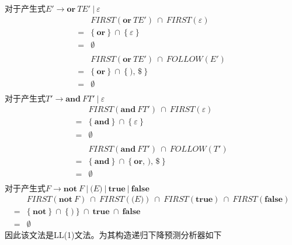 \documentclass{article}
\begin{document}
对于产生式$E' \rightarrow \textbf{or}\ TE'\ |\ \varepsilon$
\begin{align*}
    &FIRST(\textbf{or}\ TE') \ \cap \  FIRST(\varepsilon) \\ =& \big\{\ \textbf{or}\ \big\} \ \cap \  \big\{\ \varepsilon\ \big\} \\
    =& \emptyset \\
    \\
    &FIRST(\textbf{or}\ TE') \ \cap \  FOLLOW(E') \\ =& \big\{\ \textbf{or}\ \big\} \ \cap \  \big\{\ \texttt{)},\,\texttt{\$}\ \big\} \\
    =& \emptyset \\
\end{align*}
对于产生式$T' \rightarrow \textbf{and}\ FT'\ |\ \varepsilon$
\begin{align*}
    &FIRST(\textbf{and}\ FT') \ \cap \  FIRST(\varepsilon) \\ =& \big\{\ \textbf{and}\ \big\} \ \cap \  \big\{\ \varepsilon\ \big\} \\
    =& \emptyset \\
    \\
    &FIRST(\textbf{and}\ FT') \ \cap \  FOLLOW(T') \\ =& \big\{\ \textbf{and}\ \big\} \ \cap \  \big\{\ \textbf{or},\,\texttt{)},\,\texttt{\$}\ \big\} \\
    =& \emptyset \\
\end{align*}
对于产生式$F \rightarrow \textbf{not}\ F\ |\ \texttt{(}E\texttt{)}\ |\ \textbf{true}\ |\ \textbf{false}$
\begin{align*}
    &FIRST(\textbf{not}\ F) \ \cap \  FIRST(\texttt{(}E\texttt{)}) \ \cap \  FIRST(\textbf{true}) \ \cap \  FIRST(\textbf{false}) \\ = &\big\{\ \textbf{not}\ \big\} \ \cap \  \big\{\ \texttt{)}\ \big\} \ \cap \  \textbf{true} \ \cap \  \textbf{false}\\
    =& \emptyset
\end{align*}
因此该文法是LL(1)文法。为其构造递归下降预测分析器如下
\end{document}
